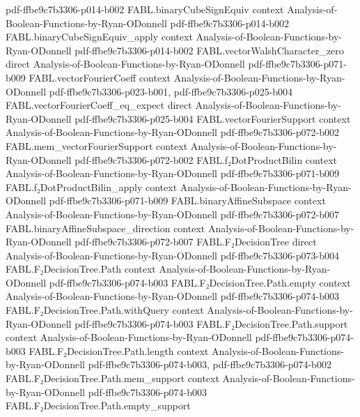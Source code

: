 \begin{theorem}
  {pdf-ffbe9c7b3306-p014-b002}
\proofstep
  {FABL.binaryCubeSignEquiv}
  {context}
  {Analysis-of-Boolean-Functions-by-Ryan-ODonnell}
  {pdf-ffbe9c7b3306-p014-b002}
\proofstep
  {FABL.binaryCubeSignEquiv_apply}
  {context}
  {Analysis-of-Boolean-Functions-by-Ryan-ODonnell}
  {pdf-ffbe9c7b3306-p014-b002}
\proofstep
  {FABL.vectorWalshCharacter_zero}
  {direct}
  {Analysis-of-Boolean-Functions-by-Ryan-ODonnell}
  {pdf-ffbe9c7b3306-p071-b009}
\proofstep
  {FABL.vectorFourierCoeff}
  {context}
  {Analysis-of-Boolean-Functions-by-Ryan-ODonnell}
  {pdf-ffbe9c7b3306-p023-b001,
    pdf-ffbe9c7b3306-p025-b004}
\proofstep
  {FABL.vectorFourierCoeff_eq_expect}
  {direct}
  {Analysis-of-Boolean-Functions-by-Ryan-ODonnell}
  {pdf-ffbe9c7b3306-p025-b004}
\proofstep
  {FABL.vectorFourierSupport}
  {context}
  {Analysis-of-Boolean-Functions-by-Ryan-ODonnell}
  {pdf-ffbe9c7b3306-p072-b002}
\proofstep
  {FABL.mem_vectorFourierSupport}
  {context}
  {Analysis-of-Boolean-Functions-by-Ryan-ODonnell}
  {pdf-ffbe9c7b3306-p072-b002}
\proofstep
  {FABL.f₂DotProductBilin}
  {context}
  {Analysis-of-Boolean-Functions-by-Ryan-ODonnell}
  {pdf-ffbe9c7b3306-p071-b009}
\proofstep
  {FABL.f₂DotProductBilin_apply}
  {context}
  {Analysis-of-Boolean-Functions-by-Ryan-ODonnell}
  {pdf-ffbe9c7b3306-p071-b009}
\proofstep
  {FABL.binaryAffineSubspace}
  {context}
  {Analysis-of-Boolean-Functions-by-Ryan-ODonnell}
  {pdf-ffbe9c7b3306-p072-b007}
\proofstep
  {FABL.binaryAffineSubspace_direction}
  {context}
  {Analysis-of-Boolean-Functions-by-Ryan-ODonnell}
  {pdf-ffbe9c7b3306-p072-b007}
\proofstep
  {FABL.F₂DecisionTree}
  {direct}
  {Analysis-of-Boolean-Functions-by-Ryan-ODonnell}
  {pdf-ffbe9c7b3306-p073-b004}
\proofstep
  {FABL.F₂DecisionTree.Path}
  {context}
  {Analysis-of-Boolean-Functions-by-Ryan-ODonnell}
  {pdf-ffbe9c7b3306-p074-b003}
\proofstep
  {FABL.F₂DecisionTree.Path.empty}
  {context}
  {Analysis-of-Boolean-Functions-by-Ryan-ODonnell}
  {pdf-ffbe9c7b3306-p074-b003}
\proofstep
  {FABL.F₂DecisionTree.Path.withQuery}
  {context}
  {Analysis-of-Boolean-Functions-by-Ryan-ODonnell}
  {pdf-ffbe9c7b3306-p074-b003}
\proofstep
  {FABL.F₂DecisionTree.Path.support}
  {context}
  {Analysis-of-Boolean-Functions-by-Ryan-ODonnell}
  {pdf-ffbe9c7b3306-p074-b003}
\proofstep
  {FABL.F₂DecisionTree.Path.length}
  {context}
  {Analysis-of-Boolean-Functions-by-Ryan-ODonnell}
  {pdf-ffbe9c7b3306-p074-b003,
    pdf-ffbe9c7b3306-p074-b002}
\proofstep
  {FABL.F₂DecisionTree.Path.mem_support}
  {context}
  {Analysis-of-Boolean-Functions-by-Ryan-ODonnell}
  {pdf-ffbe9c7b3306-p074-b003}
\proofstep
  {FABL.F₂DecisionTree.Path.empty_support}

\end{theorem}
